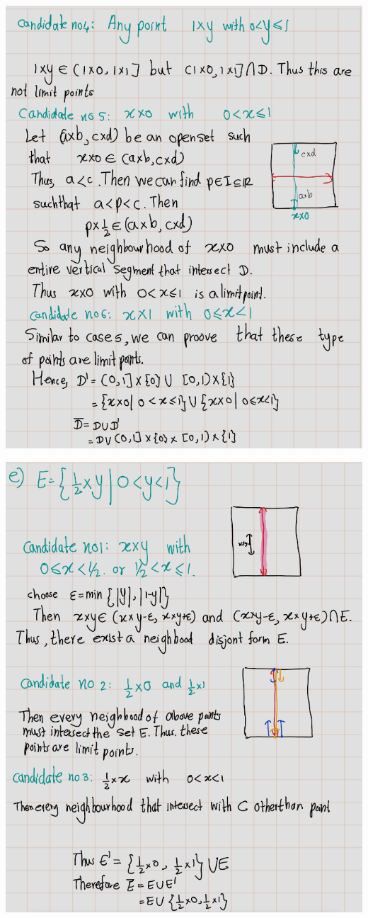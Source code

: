 \documentclass[
]{book}
\theoremstyle{definition}
\theoremstyle{definition}
\theoremstyle{definition}
\theoremstyle{definition}
\theoremstyle{remark}
\begin{document}
\includegraphics{figures/Exercises/Ex 2.17/ex-18-7.png}

\includegraphics{figures/Exercises/Ex 2.17/ex-18-8.png}
\end{document}
